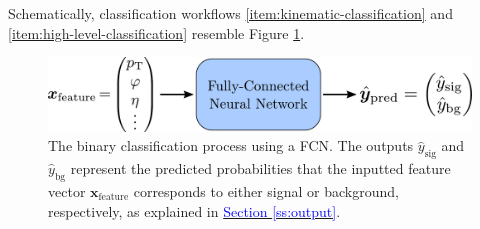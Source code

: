 \documentclass[11pt, a4paper]{article}
\newcommand{\myhref}[2]{\hyperref[#1]{\textcolor{blue}{#2}}}
\renewcommand{\vec}[1]{\bm{#1}}
\begin{document}
Schematically, classification workflows \ref{item:kinematic-classification} and \ref{item:high-level-classification} resemble Figure \ref{fig:fcn-in-out}.
\begin{figure}[htb!]
    \centering
    \includegraphics[width=0.9\linewidth]{vector/fcn-in-out.pdf}
    \caption{The binary classification process using a FCN. The outputs $ \hat{y}_{\text{sig}} $ and $ \hat{y}_{\text{bg}} $ represent the predicted probabilities that the inputted feature vector $ \vec{x}_{\text{feature}} $ corresponds to either signal or background, respectively, as explained in \myhref{ss:output}{Section \ref{ss:output}}.}
    \label{fig:fcn-in-out}
\end{figure}

\end{document}
